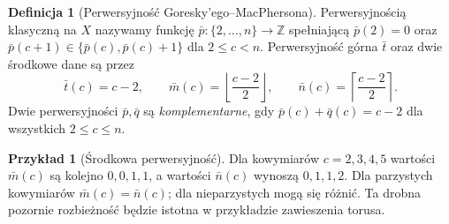 \documentclass[11pt,a4paper,oneside]{report}
\newcommand{\Z}{\mathbb{Z}}
\theoremstyle{plain}
\theoremstyle{definition}
\newtheorem{definicja}[twierdzenie]{Definicja}
\newtheorem{przyklad}[twierdzenie]{Przykład}
\theoremstyle{remark}
\begin{document}
\begin{definicja}[Perwersyjność Goresky'ego--MacPhersona]
\label{def:perversity-xiii}
Perwersyjnością klasyczną na $X$ nazywamy funkcję
$\bar p:\{2,\ldots,n\}\to\Z$ spełniającą
$\bar p(2)=0$ oraz
$\bar p(c+1)\in\{\bar p(c),\bar p(c)+1\}$
dla $2\le c<n$. Perwersyjność górna $\bar t$
oraz dwie środkowe dane są przez
\[
\bar t(c)=c-2,\qquad
\bar m(c)=\left\lfloor\frac{c-2}{2}\right\rfloor,
\qquad
\bar n(c)=\left\lceil\frac{c-2}{2}\right\rceil.
\]
Dwie perwersyjności $\bar p,\bar q$ są
\emph{komplementarne}, gdy $\bar p(c)+\bar q(c)=c-2$
dla wszystkich $2\le c\le n$.
\end{definicja}
\begin{przyklad}[Środkowa perwersyjność]
Dla kowymiarów $c=2,3,4,5$ wartości $\bar m(c)$
są kolejno $0,0,1,1$, a wartości $\bar n(c)$
wynoszą $0,1,1,2$. Dla parzystych kowymiarów
$\bar m(c)=\bar n(c)$; dla nieparzystych mogą się
różnić. Ta drobna pozornie rozbieżność będzie istotna
w przykładzie zawieszenia torusa.
\end{przyklad}
\end{document}
